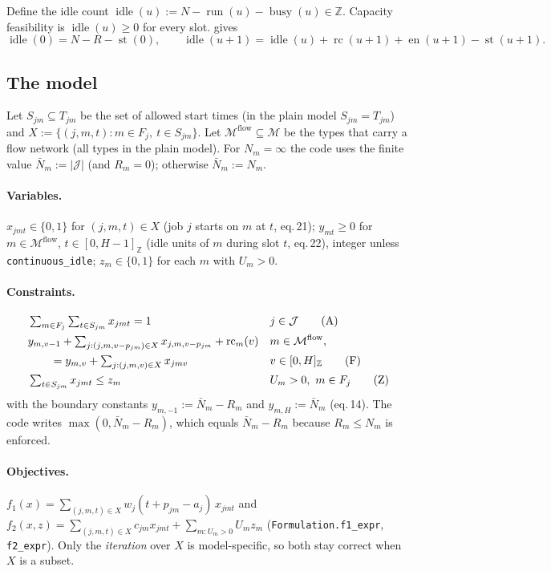 \documentclass[11pt,a4paper]{article}
\newcommand{\J}{\mathcal{J}}
\newcommand{\M}{\mathcal{M}}
\newcommand{\Run}{\operatorname{run}}
\newcommand{\Busy}{\operatorname{busy}}
\newcommand{\Starts}{\operatorname{st}}
\newcommand{\Ends}{\operatorname{en}}
\newcommand{\Rc}{\operatorname{rc}}
\newcommand{\Idle}{\operatorname{idle}}
\newcommand{\Z}{\mathbb{Z}}
\newcommand{\code}[1]{\texttt{#1}}
\begin{document}
Define the idle count $\Idle(u) := N-\Run(u)-\Busy(u)\in\Z$. Capacity
feasibility is $\Idle(u)\ge0$ for every slot.  gives
\begin{equation}\label{eq:idle}
\Idle(0)=N-R-\Starts(0),\qquad
\Idle(u+1)=\Idle(u)+\Rc(u+1)+\Ends(u+1)-\Starts(u+1).
\end{equation}

\subsection{The model}

Let $S_{jm}\subseteq T_{jm}$ be the set of allowed start times (in the plain
model $S_{jm}=T_{jm}$) and $X := \{(j,m,t): m\in F_j,\ t\in S_{jm}\}$. Let
$\M^{\mathrm{flow}}\subseteq\M$ be the types that carry a flow network (all
types in the plain model). For $N_m=\infty$ the code uses the finite value
$\bar N_m := |\J|$ (and $R_m=0$); otherwise $\bar N_m := N_m$.

\paragraph{Variables.}
$x_{jmt}\in\{0,1\}$ for $(j,m,t)\in X$ (job $j$ starts on $m$ at $t$, eq.\,21);
$y_{mt}\ge0$ for $m\in\M^{\mathrm{flow}}$, $t\in[0,H-1]_\Z$ (idle units of
$m$ during slot $t$, eq.\,22), integer unless \code{continuous\_idle};
$z_m\in\{0,1\}$ for each $m$ with $U_m>0$.

\paragraph{Constraints.}
\begin{align}
&\textstyle\sum_{m\in F_j}\sum_{t\in S_{jm}} x_{jmt} = 1 && j\in\J \tag{A}\label{eq:assign}\\
&y_{m,v-1} + \textstyle\sum_{j:(j,m,v-p_{jm})\in X} x_{j,m,v-p_{jm}} + \Rc_m(v) && m\in\M^{\mathrm{flow}}, \notag\\
&\qquad = y_{m,v} + \textstyle\sum_{j:(j,m,v)\in X} x_{jmv} && v\in[0,H]_\Z \tag{F}\label{eq:flow}\\
&\textstyle\sum_{t\in S_{jm}} x_{jmt}\le z_m && U_m>0,\ m\in F_j \tag{Z}\label{eq:fixed}
\end{align}
with the boundary constants $y_{m,-1}:=\bar N_m-R_m$ and $y_{m,H}:=\bar N_m$
(eq.\,14). The code writes $\max(0,\bar N_m-R_m)$, which equals
$\bar N_m-R_m$ because $R_m\le N_m$ is enforced.

\paragraph{Objectives.}
$f_1(x)=\sum_{(j,m,t)\in X} w_j(t+p_{jm}-a_j)\,x_{jmt}$ and
$f_2(x,z)=\sum_{(j,m,t)\in X} c_{jm}x_{jmt}+\sum_{m:U_m>0}U_m z_m$
(\code{Formulation.f1\_expr}, \code{f2\_expr}). Only the \emph{iteration} over
$X$ is model-specific, so both stay correct when $X$ is a subset.
\end{document}
